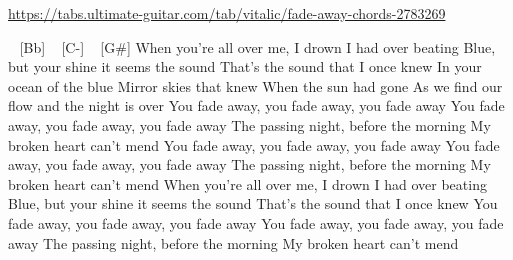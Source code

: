 \url{https://tabs.ultimate-guitar.com/tab/vitalic/fade-away-chords-2783269}

\begin{guitar}
[Eb] ~ [Bb] ~ [C-] ~ [G#]
When you’re all over me, I drown
I had over beating
Blue, but your shine it seems the sound
That’s the sound that I once knew
In your ocean of the blue
Mirror skies that knew
When the sun had gone
As we find our flow and the night is over
You fade away, you fade away, you fade away
You fade away, you fade away, you fade away
The passing night, before the morning
My broken heart can’t mend
You fade away, you fade away, you fade away
You fade away, you fade away, you fade away
The passing night, before the morning
My broken heart can’t mend
When you’re all over me, I drown
I had over beating
Blue, but your shine it seems the sound
That’s the sound that I once knew
You fade away, you fade away, you fade away
You fade away, you fade away, you fade away
The passing night, before the morning
My broken heart can’t mend
\end{guitar}